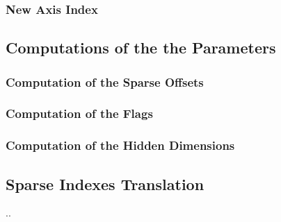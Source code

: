 \subsubsection{New Axis Index}

\subsection{Computations of the the Parameters}
\subsubsection{Computation of the Sparse Offsets}
\subsubsection{Computation of the Flags}
\subsubsection{Computation of the Hidden Dimensions}

\subsection{Sparse Indexes Translation}
..